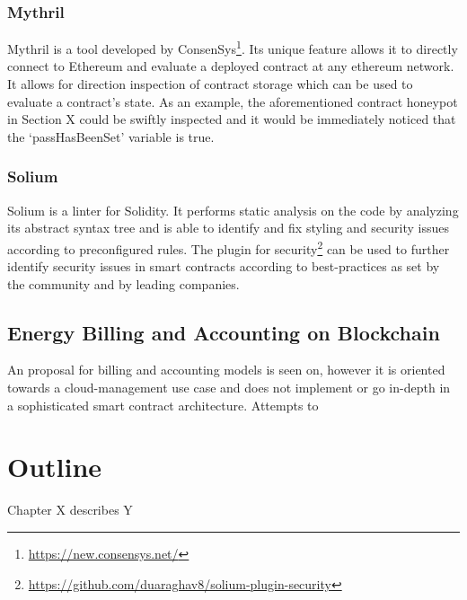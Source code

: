 \subsubsection{Mythril}
Mythril \cite{mythril} is a tool developed by ConsenSys\footnote{\url{https://new.consensys.net/}}. Its unique feature allows it to directly connect to Ethereum and evaluate a deployed contract at any ethereum network. It allows for direction inspection of contract storage which can be used to evaluate a contract's state. As an example, the aforementioned contract honeypot in Section X could be swiftly inspected and it would be immediately noticed that the `passHasBeenSet' variable is true.


\subsubsection{Solium}
Solium \cite{solium} is a linter for Solidity. It performs static analysis on the code by analyzing its abstract syntax tree and is able to identify and fix styling and security issues according to preconfigured rules. The plugin for security\footnote{\url{https://github.com/duaraghav8/solium-plugin-security}} can be used to further identify security issues in smart contracts according to best-practices as set by the community and by leading companies.

\subsection{Energy Billing and Accounting on Blockchain}
An proposal for billing and accounting models is seen on\cite{billaccount}, however it is oriented towards a cloud-management use case and does not implement or go in-depth in a sophisticated smart contract architecture. Attempts to 



\section{Outline}
Chapter X describes Y